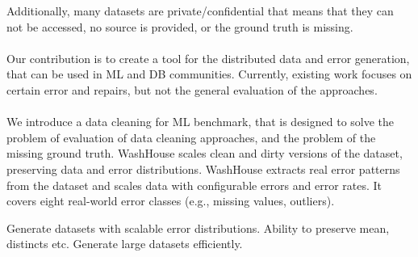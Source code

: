Additionally, many datasets are private/confidential that means that they can not be accessed, no source is provided, or the ground truth is missing. 
\\\\
Our contribution is to create a tool for the distributed data and error generation, that can be used in ML and DB communities. 
Currently, existing work focuses on certain error and repairs, but not the general evaluation of the approaches.
\\\\
We introduce a data cleaning for ML benchmark, that is designed to solve the problem of evaluation of data cleaning approaches, and the problem of the missing ground truth.
WashHouse scales clean and dirty versions of the dataset, preserving data and error distributions. 
WashHouse extracts real error patterns from the dataset and scales data with configurable errors and error rates. 
It covers eight real-world error classes (e.g., missing values, outliers).

Generate datasets with scalable error distributions. Ability to preserve mean, distincts etc. Generate large datasets efficiently.

